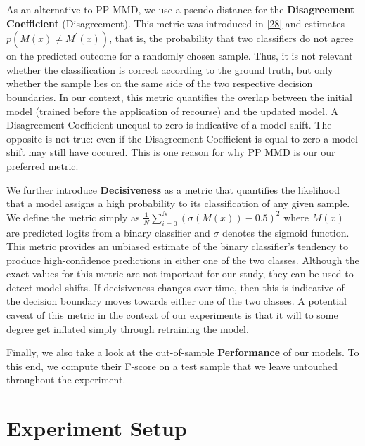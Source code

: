 \documentclass[conference,final,]{IEEEtran}
\theoremstyle{definition}
\theoremstyle{definition}
\theoremstyle{definition}
\theoremstyle{definition}
\theoremstyle{remark}
\begin{document}
As an alternative to PP MMD, we use a pseudo-distance for the \textbf{Disagreement Coefficient} (Disagreement). This metric was introduced in \protect\hyperlink{ref-hanneke2007bound}{{[}28{]}} and estimates \(p(M(x) \neq M^\prime(x))\), that is, the probability that two classifiers do not agree on the predicted outcome for a randomly chosen sample. Thus, it is not relevant whether the classification is correct according to the ground truth, but only whether the sample lies on the same side of the two respective decision boundaries. In our context, this metric quantifies the overlap between the initial model (trained before the application of recourse) and the updated model. A Disagreement Coefficient unequal to zero is indicative of a model shift. The opposite is not true: even if the Disagreement Coefficient is equal to zero a model shift may still have occured. This is one reason for why PP MMD is our our preferred metric.

We further introduce \textbf{Decisiveness} as a metric that quantifies the likelihood that a model assigns a high probability to its classification of any given sample. We define the metric simply as \({\frac{1}{N}}\sum_{i=0}^N(\sigma(M(x)) - 0.5)^2\) where \(M(x)\) are predicted logits from a binary classifier and \(\sigma\) denotes the sigmoid function. This metric provides an unbiased estimate of the binary classifier's tendency to produce high-confidence predictions in either one of the two classes. Although the exact values for this metric are not important for our study, they can be used to detect model shifts. If decisiveness changes over time, then this is indicative of the decision boundary moves towards either one of the two classes. A potential caveat of this metric in the context of our experiments is that it will to some degree get inflated simply through retraining the model.

Finally, we also take a look at the out-of-sample \textbf{Performance} of our models. To this end, we compute their F-score on a test sample that we leave untouched throughout the experiment.

\hypertarget{empirical}{%
\section{Experiment Setup}\label{empirical}}
\end{document}
